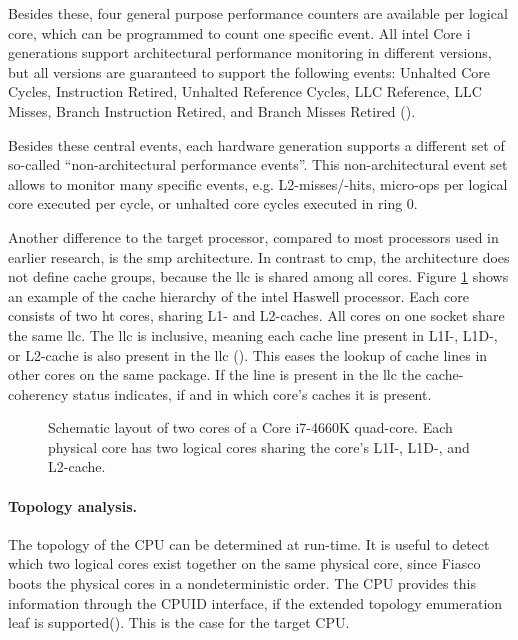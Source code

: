 Besides these, four general purpose performance counters are available per
logical core, which can be programmed to count one specific event.
All \gls{intel} Core i generations support architectural performance monitoring
in different versions, but all versions are guaranteed to support the following
events:
Unhalted Core Cycles, Instruction Retired, Unhalted Reference Cycles,
LLC Reference, LLC Misses, Branch Instruction Retired,
and Branch Misses Retired (\cite{intel_arch_ref_manual_2015}).

Besides these central events, each hardware generation supports a different set
of so-called ``non-architectural performance events''.
This non-architectural event set allows to monitor many specific events, e.g.
L2-misses/-hits, micro-ops per logical core executed per cycle, or unhalted
core cycles executed in ring 0.

Another difference to the target processor, compared to most processors used in
earlier research, is the \gls{smp} architecture.
In contrast to \gls{cmp}, the architecture does not define cache groups,
because the \gls{llc} is shared among all cores.
Figure \ref{state:fig:core_layout} shows an example of the cache hierarchy of
the \gls{intel} Haswell processor.
Each core consists of two \gls{ht} cores, sharing L1- and L2-caches.
All cores on one socket share the same \gls{llc}.
The \gls{llc} is inclusive, meaning each cache line present in L1I-, L1D-, or
L2-cache is also present in the \gls{llc}
(\cite[2-23]{intel_optimization_manual_2015}).
This eases the lookup of cache lines in other cores on the same package.
If the line is present in the \gls{llc} the cache-coherency status indicates,
if and in which core's caches it is present.


\begin{figure}[h!]
  \setcapindent*{1em}
  \begin{captionbeside}[]{Schematic layout of two cores of a Core i7-4660K quad-core.
    Each physical core has two logical cores sharing the core's L1I-,
    L1D-, and L2-cache.}
  
\end{captionbeside}
  \label{state:fig:core_layout}
\end{figure}

\paragraph{Topology analysis.}
The topology of the CPU can be determined at run-time.
It is useful to detect which two logical cores exist together on the same
physical core, since Fiasco boots the physical cores in a nondeterministic order.
The CPU provides this information through the CPUID interface, if the
extended topology enumeration leaf is supported(\cite[Vol.2A
3-179]{intel_arch_ref_manual_2015}). This is the case for the
target CPU.


